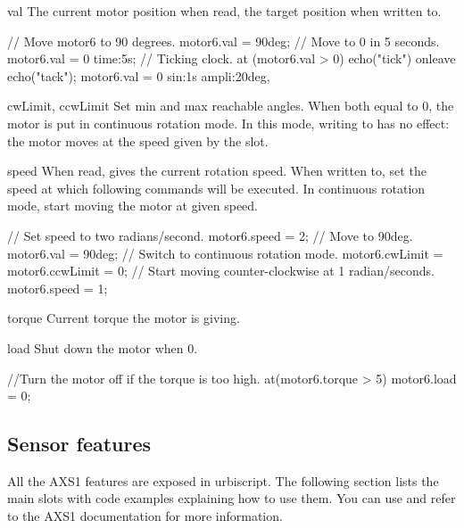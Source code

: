 \begin{urbiscriptapi}
\item[val] The current motor position when read, the target position when
  written to.

\begin{urbiunchecked}
// Move motor6 to 90 degrees.
motor6.val = 90deg;
// Move to 0 in 5 seconds.
motor6.val = 0 time:5s;
// Ticking clock.
at (motor6.val > 0) echo("tick") onleave echo("tack");
motor6.val = 0 sin:1s ampli:20deg,
\end{urbiunchecked}

\item[cwLimit, ccwLimit]%
  Set min and max reachable angles. When both equal to 0, the motor is put
  in continuous rotation mode. In this mode, writing to  has no
  effect: the motor moves at the speed given by the  slot.

\item[speed] When read, gives the current rotation speed. When written to,
  set the speed at which following commands will be executed. In continuous
  rotation mode, start moving the motor at given speed.
\begin{urbiunchecked}
// Set speed to two radians/second.
motor6.speed = 2;
// Move to 90deg.
motor6.val = 90deg;
// Switch to continuous rotation mode.
motor6.cwLimit = motor6.ccwLimit = 0;
// Start moving counter-clockwise at 1 radian/seconds.
motor6.speed = 1;
\end{urbiunchecked}

\item[torque]
  Current torque the motor is giving.

\item[load]
  Shut down the motor when 0.

\begin{urbiunchecked}
//Turn the motor off if the torque is too high.
at(motor6.torque > 5) motor6.load = 0;
\end{urbiunchecked}

\end{urbiscriptapi}

\subsection{Sensor features}
\def\currentObject{AXS1}

All the AXS1 features are exposed in urbiscript. The following section lists
the main slots with code examples explaining how to use them.  You can use
 and refer to the AXS1 documentation for
more information.

